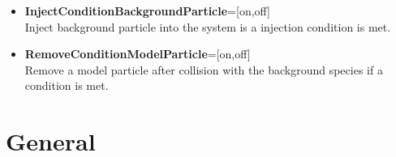 \begin{itemize}
{\tt CollisionScatteringAngle=isotropic}

Example (function): 

{\tt CollisionScatteringAngle=function $\backslash\backslash$ \\ FunctionName={\it function-name}} 

\item {\bf InjectConditionBackgroundParticle}=[on,off] \\ Inject background particle into the system is a injection condition is met.

\item {\bf RemoveConditionModelParticle}=[on,off] \\ Remove a model particle after collision with the background species if a condition is met.


\end{itemize}












\section{General}

